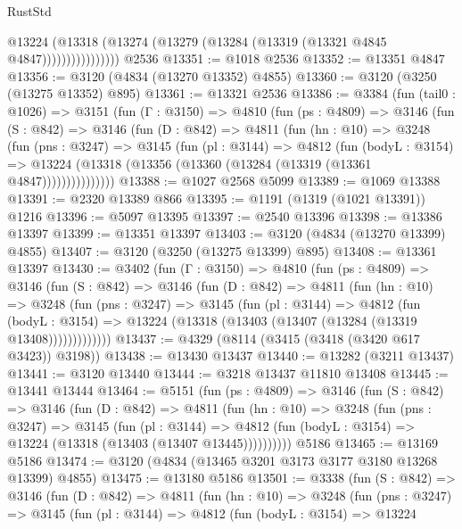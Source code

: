 \begin{lexlean}{RustStd}
\begin{coremodule}
{\begin{coremodule}
{{{{{{{{{{{{{{{{{{{{{{{{{{                      @13224
                        (@13318 (@13274 (@13279 (@13284 (@13319 (@13321 @4845 @4847))))))))))))))))
    @2536
@13351 := @1018 @2536
@13352 := @13351 @4847
@13356 := @3120 (@4834 (@13270 @13352) @4855)
@13360 := @3120 (@3250 (@13275 @13352) @895)
@13361 := @13321 @2536
@13386 := @3384
    (fun (tail0 : @1026) =>
    @3151
      (fun (Γ : @3150) =>
      @4810
        (fun (ps : @4809) =>
        @3146
          (fun (S : @842) =>
          @3146
            (fun (D : @842) =>
            @4811
              (fun (hn : @10) =>
              @3248
                (fun (pns : @3247) =>
                @3145
                  (fun (pl : @3144) =>
                  @4812
                    (fun (bodyL : @3154) =>
                    @13224 (@13318 (@13356 (@13360 (@13284 (@13319 (@13361 @4847)))))))))))))))
@13388 := @1027 @2568 @5099
@13389 := @1069 @13388
@13391 := @2320 @13389 @866
@13395 := @1191 (@1319 (@1021 @13391)) @1216
@13396 := @5097 @13395
@13397 := @2540 @13396
@13398 := @13386 @13397
@13399 := @13351 @13397
@13403 := @3120 (@4834 (@13270 @13399) @4855)
@13407 := @3120 (@3250 (@13275 @13399) @895)
@13408 := @13361 @13397
@13430 := @3402
    (fun (Γ : @3150) =>
    @4810
      (fun (ps : @4809) =>
      @3146
        (fun (S : @842) =>
        @3146
          (fun (D : @842) =>
          @4811
            (fun (hn : @10) =>
            @3248
              (fun (pns : @3247) =>
              @3145
                (fun (pl : @3144) =>
                @4812
                  (fun (bodyL : @3154) =>
                  @13224 (@13318 (@13403 (@13407 (@13284 (@13319 @13408)))))))))))))
@13437 := @4329 (@8114 (@3415 (@3418 (@3420 @617 @3423)) @3198))
@13438 := @13430 @13437
@13440 := @13282 (@3211 @13437)
@13441 := @3120 @13440
@13444 := @3218 @13437 @11810 @13408
@13445 := @13441 @13444
@13464 := @5151
    (fun (ps : @4809) =>
    @3146
      (fun (S : @842) =>
      @3146
        (fun (D : @842) =>
        @4811
          (fun (hn : @10) =>
          @3248
            (fun (pns : @3247) =>
            @3145
              (fun (pl : @3144) =>
              @4812 (fun (bodyL : @3154) => @13224 (@13318 (@13403 (@13407 @13445))))))))))
    @5186
@13465 := @13169 @5186
@13474 := @3120 (@4834 (@13465 @3201 @3173 @3177 @3180 @13268 @13399) @4855)
@13475 := @13180 @5186
@13501 := @3338
    (fun (S : @842) =>
    @3146
      (fun (D : @842) =>
      @4811
        (fun (hn : @10) =>
        @3248
          (fun (pns : @3247) =>
          @3145
            (fun (pl : @3144) =>
            @4812
              (fun (bodyL : @3154) =>
              @13224
}}}}}}}}}}}}}}}}}}}}}}}}}}
\end{coremodule}}
\end{coremodule}
\end{lexlean}
